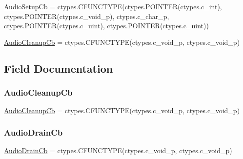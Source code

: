 \begin{DoxyCompactItemize}
\item 
\hyperlink{classvlc_1_1_callback_decorators_af05cf950711845971b03886a93642d9f}{Audio\+Setup\+Cb} = ctypes.\+C\+F\+U\+N\+C\+T\+Y\+PE(ctypes.\+P\+O\+I\+N\+T\+ER(ctypes.\+c\+\_\+int), ctypes.\+P\+O\+I\+N\+T\+ER(ctypes.\+c\+\_\+void\+\_\+p), ctypes.\+c\+\_\+char\+\_\+p, ctypes.\+P\+O\+I\+N\+T\+ER(ctypes.\+c\+\_\+uint), ctypes.\+P\+O\+I\+N\+T\+ER(ctypes.\+c\+\_\+uint))
\item 
\hyperlink{classvlc_1_1_callback_decorators_a0c4f8d08ce4fddc3ff9286b1de60d6fa}{Audio\+Cleanup\+Cb} = ctypes.\+C\+F\+U\+N\+C\+T\+Y\+PE(ctypes.\+c\+\_\+void\+\_\+p, ctypes.\+c\+\_\+void\+\_\+p)
\end{DoxyCompactItemize}


\subsection{Field Documentation}
\mbox{\label{classvlc_1_1_callback_decorators_a0c4f8d08ce4fddc3ff9286b1de60d6fa}} 
\subsubsection{\texorpdfstring{Audio\+Cleanup\+Cb}{AudioCleanupCb}}
{\footnotesize\ttfamily \hyperlink{classvlc_1_1_audio_cleanup_cb}{Audio\+Cleanup\+Cb} = ctypes.\+C\+F\+U\+N\+C\+T\+Y\+PE(ctypes.\+c\+\_\+void\+\_\+p, ctypes.\+c\+\_\+void\+\_\+p)\hspace{0.3cm}{\ttfamily [static]}}

\mbox{\label{classvlc_1_1_callback_decorators_a65127efbdada57ccc961fb642fd7907c}} 
\subsubsection{\texorpdfstring{Audio\+Drain\+Cb}{AudioDrainCb}}
{\footnotesize\ttfamily \hyperlink{classvlc_1_1_audio_drain_cb}{Audio\+Drain\+Cb} = ctypes.\+C\+F\+U\+N\+C\+T\+Y\+PE(ctypes.\+c\+\_\+void\+\_\+p, ctypes.\+c\+\_\+void\+\_\+p)\hspace{0.3cm}{\ttfamily [static]}}

